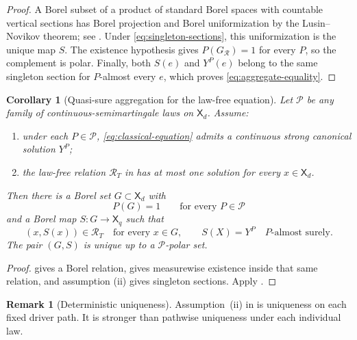 \documentclass[11pt,reqno]{amsart}
\theoremstyle{plain}
\newtheorem{corollary}[corollary]{Corollary}
\theoremstyle{definition}
\newtheorem{remark}[remark]{Remark}
\newcommand{\cP}{\mathcal P}
\newcommand{\cR}{\mathcal R}
\begin{document}
\begin{proof}
A Borel subset of a product of standard Borel spaces with countable vertical
sections has Borel projection and Borel uniformization by the
Lusin--Novikov theorem; see \cite{Kechris95}.  Under
\eqref{eq:singleton-sections}, this uniformization is the unique map \(S\).
The existence hypothesis gives \(P(G_{\cR})=1\) for every \(P\), so the
complement is polar.  Finally, both \(S(e)\) and \(Y^P(e)\) belong to the same
singleton section for \(P\)-almost every \(e\), which proves
\eqref{eq:aggregate-equality}.
\end{proof}

\begin{corollary}[Quasi-sure aggregation for the law-free equation]
\label{cor:equation-aggregation}
Let \(\cP\) be any family of continuous-semimartingale laws on
\(\mathsf X_d\).  Assume:
\begin{enumerate}[label=(\roman*),leftmargin=2.2em]
  \item under each \(P\in\cP\), \eqref{eq:classical-equation} admits a
  continuous strong canonical solution \(Y^P\);
  \item the law-free relation \(\cR_T\) in
   has at most one solution for every
  \(x\in\mathsf X_d\).
\end{enumerate}
Then there is a Borel set \(G\subset\mathsf X_d\) with
\[
  P(G)=1\qquad\text{for every }P\in\cP
\]
and a Borel map \(S:G\to\mathsf X_q\) such that
\[
  (x,S(x))\in\cR_T\quad\text{for every }x\in G,
  \qquad
  S(X)=Y^P\quad P\text{-almost surely}.
\]
The pair \((G,S)\) is unique up to a \(\cP\)-polar set.
\end{corollary}

\begin{proof}
 gives a Borel relation,
 gives measurewise existence inside that
same relation, and assumption (ii) gives singleton sections.  Apply
.
\end{proof}

\begin{remark}[Deterministic uniqueness]\label{rem:uniqueness-required}
Assumption~(ii) in  is uniqueness on each
fixed driver path.  It is stronger than pathwise uniqueness under each
individual law.
\end{remark}
\end{document}
